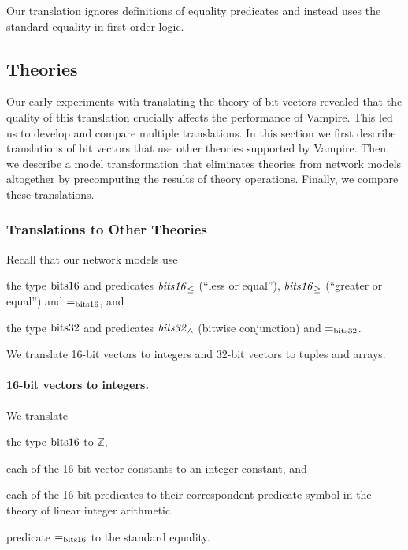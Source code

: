Our translation ignores definitions of equality predicates and instead uses the standard equality in first-order logic. %

\subsection{Theories}
\label{sect:aws/fol/theories}
Our early experiments with translating the theory of bit vectors revealed that the quality of this translation crucially affects the performance of Vampire. This led us to develop and compare multiple translations. In this section we first describe translations of bit vectors that use other theories supported by Vampire. Then, we describe a model transformation that eliminates theories from network models altogether by precomputing the results of theory operations. Finally, we compare these translations.

\subsubsection*{Translations to Other Theories}
Recall that our network models use
\begin{enumerate*}[label=(\roman*)]
  \item the type $\mathrm{bits16}$ and predicates $\mathit{bits16}_{\le}$ (``less or equal''), $\mathit{bits16}_{\ge}$ (``greater or equal'') and $\mathit{=}_{\mathrm{bits16}}$, and
  \item the type $\mathrm{bits32}$ and predicates $\mathit{bits32}_\wedge$ (bitwise conjunction) and $\mathit{=}_{\mathrm{bits32}}$.
\end{enumerate*}
We translate 16-bit vectors to integers and 32-bit vectors to tuples and arrays.

\paragraph{16-bit vectors to integers.}
We translate
\begin{enumerate*}[label=(\roman*)]
  \item the type $\mathrm{bits16}$ to $\mathbb{Z}$,
  \item each of the 16-bit vector constants to an integer constant, and
  \item each of the 16-bit predicates to their correspondent predicate symbol in the theory of linear integer arithmetic.
  \item predicate $\mathit{=}_{\mathrm{bits16}}$ to the standard equality.
\end{enumerate*}

